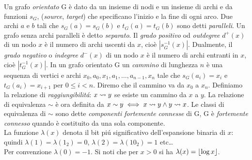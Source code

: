 Un grafo \textit{orientato} G è dato da un insieme di nodi  e un insieme di archi  e da funzioni $s_G$,  (\textit{source}, \textit{target}) che specificano l'inizio e la fine di ogni arco. Due archi $a$ e $b$ tali che $s_G(a) = s_G(b)$ e $t_G(a) = t_G(b)$ sono detti \textit{paralleli}. Un grafo senza archi paralleli è detto \textit{separato}. Il \textit{grado positivo} od \textit{outdegree} $d^+(x)$ di un nodo $x$ è il numero di archi uscenti da $x$, cioè $|s_G^{-1}(x)|$. Dualmente, il \textit{grado negativo} o \textit{indegree} $d^-(x)$ di un nodo $x$ è il numero di archi entranti in $x$, cioè $|t_G^{-1}(x)|$. In un grafo orientato G un \textit{cammino} di lunghezza $n$ è una sequenza di vertici e archi $x_0, a_0, x_1, a_1, \dots, a_{n - 1}, x_n$ tale che $s_G(a_i) = x_i$ e $t_G(a_i) = x_{i + 1}$ per $0 \leq i < n$. Diremo che il cammino va da $x_0$ a $x_n$.
Definiamo la relazione di \textit{raggiungibilitá}: $x \mathrel{\leadsto} y$ se esiste un cammino da $x$ a $y$. La relazione di equivalenza $\sim$ è ora definita da $x \sim y \iff x \mathrel{\leadsto} y \land y \mathrel{\leadsto} x$. Le classi di equivalenza di $\sim$ sono dette \textit{componenti fortemente connesse} di G, G è \textit{fortemente connesso} quando è costituito da una sola componente.\\
La funzione $\lambda(x)$ denota il bit piú significativo dell'espansione binaria di $x$: quindi $\lambda(1) = \lambda(1_2) = 0$, $\lambda(2) = \lambda(10_2) = 1$ etc\dots\\
Per convenzione $\lambda(0) = -1$. Si noti che per $x > 0$ si ha $\lambda(x) = \left\lfloor \log{x} \right\rfloor$.